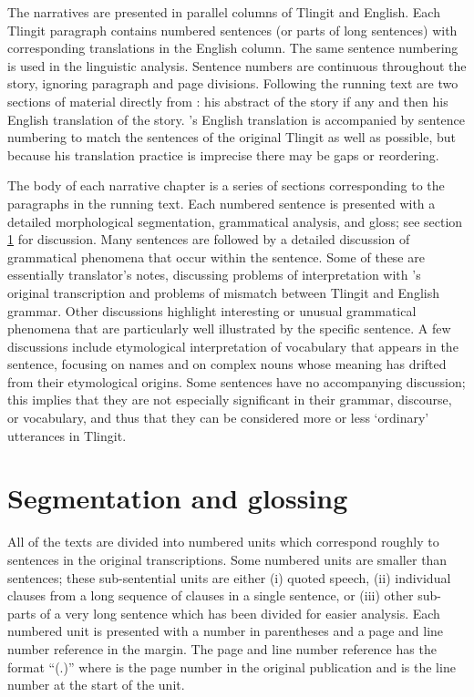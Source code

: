 The narratives are presented in parallel columns of Tlingit and English.
Each Tlingit paragraph contains numbered sentences (or parts of long sentences) with corresponding translations in the English column.
The same sentence numbering is used in the linguistic analysis.
Sentence numbers are continuous throughout the story, ignoring paragraph and page divisions.
Following the running text are two sections of material directly from \citeauthor{swanton:1909}: his abstract of the story if any and then his English translation of the story.
\citeauthor{swanton:1909}’s English translation is accompanied by sentence numbering to match the sentences of the original Tlingit as well as possible, but because his translation practice is imprecise there may be gaps or reordering.

The body of each narrative chapter is a series of sections corresponding to the paragraphs in the running text.
Each numbered sentence is presented with a detailed morphological segmentation, grammatical analysis, and gloss; see section \ref{sec:intro-seg-gloss} for discussion.
Many sentences are followed by a detailed discussion of grammatical phenomena that occur within the sentence.
Some of these are essentially translator’s notes, discussing problems of interpretation with \citeauthor{swanton:1909}’s original transcription and problems of mismatch between Tlingit and English grammar.
Other discussions highlight interesting or unusual grammatical phenomena that are particularly well illustrated by the specific sentence.
A few discussions include etymological interpretation of vocabulary that appears in the sentence, focusing on names and on complex nouns whose meaning has drifted from their etymological origins.
Some sentences have no accompanying discussion; this implies that they are not especially significant in their grammar, discourse, or vocabulary, and thus that they can be considered more or less ‘ordinary’ utterances in Tlingit.



\section{Segmentation and glossing}\label{sec:intro-seg-gloss}

All of the texts are divided into numbered units which correspond roughly to sentences in the original transcriptions.
Some numbered units are smaller than sentences; these sub-sentential units are either (i) quoted speech, (ii) individual clauses from a long sequence of clauses in a single sentence, or (iii) other sub-parts of a very long sentence which has been divided for easier analysis.
Each numbered unit is presented with a number in parentheses and a page and line number reference in the margin.
The page and line number reference has the format “(.)” where  is the page number in the original publication and  is the line number at the start of the unit.

